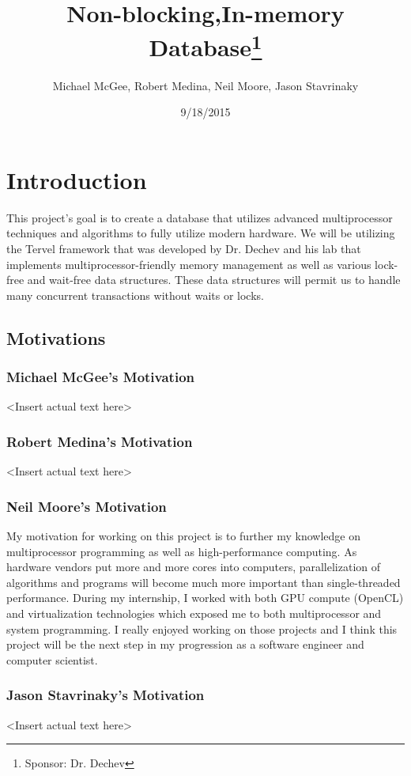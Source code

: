 \documentclass[letterpaper]{article}
\title{Non-blocking,In-memory Database\thanks{Sponsor: Dr. Dechev}}
\author{Michael McGee, Robert Medina, Neil Moore, Jason Stavrinaky}
\date{9/18/2015}
\begin{document}
  \maketitle
  \newpage

  \section{Introduction}
  This project's goal is to create a database that utilizes advanced multiprocessor techniques and algorithms to fully utilize modern hardware.
  We will be utilizing the Tervel framework that was developed by Dr. Dechev and his lab that implements multiprocessor-friendly memory management
  as well as various lock-free and wait-free data structures. These data structures will permit us to handle many concurrent transactions without 
  waits or locks.
  
  \subsection{Motivations}
  \subsubsection{Michael McGee's Motivation}
  \textless Insert actual text here\textgreater
  \subsubsection{Robert Medina's Motivation}
  \textless Insert actual text here\textgreater
  \subsubsection{Neil Moore's Motivation}
  My motivation for working on this project is to further my knowledge on multiprocessor programming as well as high-performance computing.  
  As hardware vendors put more and more cores into computers, parallelization of algorithms and programs will become much more important than
  single-threaded performance. During my internship, I worked with both GPU compute (OpenCL) and virtualization technologies which exposed me
  to both multiprocessor and system programming. I really enjoyed working on those projects and I think this project will be the next step 
  in my progression as a software engineer and computer scientist.
  \subsubsection{Jason Stavrinaky's Motivation}
  \textless Insert actual text here\textgreater
  
\end{document}
